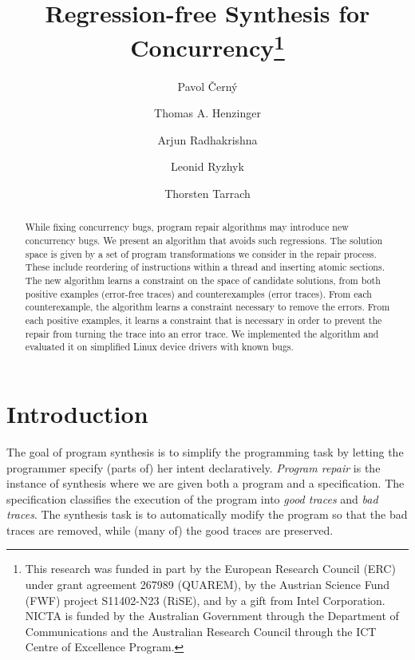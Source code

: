 \documentclass{llncs}
\begin{document}
\title{Regression-free Synthesis for Concurrency\thanks{This 
    research was funded in part by the European Research Council (ERC)
    under grant agreement 267989 (QUAREM), by the Austrian Science
    Fund (FWF) project S11402-N23 (RiSE), and by a gift from Intel
    Corporation. NICTA is funded by the Australian Government through
    the Department of Communications and the Australian Research Council
through the ICT Centre of Excellence Program.}} 
\author{Pavol {\v C}ern{\'y} \and Thomas A. Henzinger
\and Arjun Radhakrishna \and Leonid
Ryzhyk\and Thorsten Tarrach}
\maketitle

\begin{abstract}
While fixing concurrency bugs, program repair algorithms may introduce new
concurrency bugs.
We present an algorithm that avoids such regressions.
The solution space is given by a set of program transformations we consider
in the repair process. 
These include   
reordering of instructions within a thread and inserting atomic sections. 
The new algorithm learns a constraint on the space of candidate solutions, 
from both positive examples (error-free traces) and counterexamples (error
traces).    
From each counterexample, the algorithm learns a constraint necessary to
remove the errors.
From each positive examples, it learns a constraint that is
necessary in order to prevent the repair from turning the trace into an
error trace. 
We implemented the algorithm and evaluated it on simplified Linux
device drivers with known bugs.  
\end{abstract}



\section{Introduction}
\label{sec:intro}

The goal of program synthesis is to simplify the programming task by 
letting the programmer specify (parts of) her intent declaratively.
{\em Program repair} is the instance of synthesis where we are given both a 
program and a specification. 
The specification classifies the execution of the program into {\em good
traces} and {\em bad traces}. 
The synthesis task is to automatically modify the program so that the 
bad traces are removed, while (many of) the good traces are preserved. 
\end{document}
